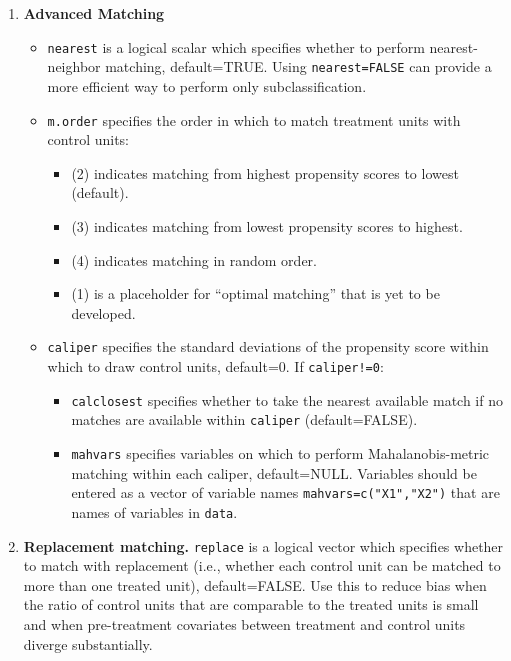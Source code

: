 \documentclass[oneside,letterpaper,titlepage]{article}
\begin{document}
\begin{enumerate}
\item \textbf{Advanced Matching}
  \begin{itemize}
  \item \texttt{nearest} is a logical scalar which specifies whether
    to perform nearest-neighbor matching, default=TRUE.  Using
    \texttt{nearest=FALSE} can provide a more efficient way to
    perform only subclassification. 
  \item \texttt{m.order}  specifies the order in which to match
    treatment units with control units:
    \begin{itemize}
    \item (2) indicates matching from highest propensity scores to
      lowest (default).
    \item (3) indicates matching from lowest propensity scores to
      highest.
    \item (4) indicates matching in random order.
    \item (1) is a placeholder for ``optimal matching'' that is yet to be
      developed.
    \end{itemize}
  \item \texttt{caliper} specifies the standard deviations of 
    the propensity score within which to draw control units,
    default=0.  If \texttt{caliper!=0}: 
    \begin{itemize} 
    \item \texttt{calclosest} specifies whether to take the nearest
      available match if no matches are available within
      \texttt{caliper} (default=FALSE).
    \item \texttt{mahvars} specifies variables on which to perform
      Mahalanobis-metric matching within each caliper, default=NULL.
      Variables should be entered as a vector of variable names
      \texttt{mahvars=c("X1","X2")} that are names of variables in
      \texttt{data}.
    \end{itemize}
  \end{itemize}
  
\item \textbf{Replacement matching.} \texttt{replace} is a logical
  vector which specifies whether to match with replacement (i.e.,
  whether each control unit can be matched to more than one treated
  unit), default=FALSE.  Use this to reduce bias when the ratio of
  control units that are comparable to the treated units is small and
  when pre-treatment covariates between treatment and control units
  diverge substantially.
  

\end{enumerate}
\end{document}
